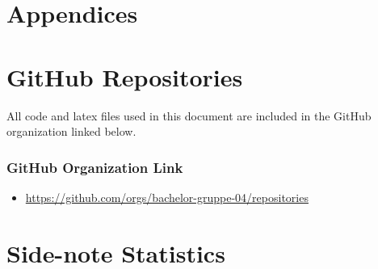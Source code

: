 \chapter*{\LARGE Appendices}

\appendix

\chapter{GitHub Repositories}

All code and latex files used in this document are included in the GitHub organization linked below.

\subsection*{GitHub Organization Link}

\begin{itemize}
    \item \url{https://github.com/orgs/bachelor-gruppe-04/repositories}
\end{itemize}

\chapter{Side-note Statistics}

